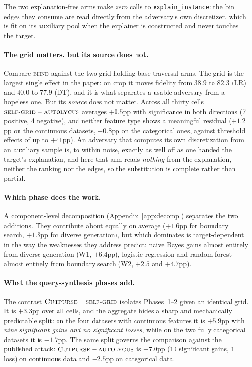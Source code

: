 \documentclass[sigconf,anonymous,review]{acmart}
\newcommand{\sys}{\textsc{Cutpurse}}
\begin{document}
The two explanation-free arms make \emph{zero} calls to \texttt{explain\_instance}: the bin edges they
consume are read directly from the adversary's own discretizer, which is fit on its auxiliary pool
when the explainer is constructed and never touches the target.


\paragraph{The grid matters, but its source does not.} Compare \textsc{blind} against the two
grid-holding base-traversal arms. The grid is the largest single effect in the paper: on crop it moves
fidelity from $38.9$ to $82.3$ (LR) and $40.0$ to $77.9$ (DT), and it is what separates a usable
adversary from a hopeless one. But its \emph{source} does not matter. Across all thirty cells
$\textsc{self-grid}-\textsc{autolycus}$ averages $+0.5$pp with significance in both directions
(7 positive, 4 negative), and neither feature type shows a meaningful residual
($+1.2$pp on the continuous datasets, $-0.8$pp on the categorical ones, against threshold effects of
up to $+41$pp). An adversary that computes
its own discretization from an auxiliary sample is, to within noise, exactly as well off as one handed the target's explanation, and here that arm reads \emph{nothing} from the explanation, neither the
ranking nor the edges, so the substitution is complete rather than partial.

\paragraph{Which phase does the work.} A component-level decomposition
(Appendix~\ref{app:decomp}) separates the two additions. They contribute about equally on average
($+1.6$pp for boundary search, $+1.8$pp for diverse generation), but which dominates is
target-dependent in the way the weaknesses they address predict: naive Bayes gains almost entirely
from diverse generation (W1, $+6.4$pp), logistic regression and random forest almost entirely from
boundary search (W2, $+2.5$ and $+4.7$pp).

\paragraph{What the query-synthesis phases add.} The contrast
$\sys-\textsc{self-grid}$ isolates Phases~1--2 given an identical grid. It is
$+3.3$pp over all cells, and the aggregate hides a sharp and
mechanically predictable split: on the four datasets with continuous features it is $+5.9$pp with
\emph{nine significant gains and no significant losses}, while on the two fully categorical datasets it
is $-1.7$pp. The same split governs the comparison against the published attack:
$\sys-\textsc{autolycus}$ is $+7.0$pp (10 significant gains, 1 loss) on continuous data
and $-2.5$pp on categorical data.
\end{document}
